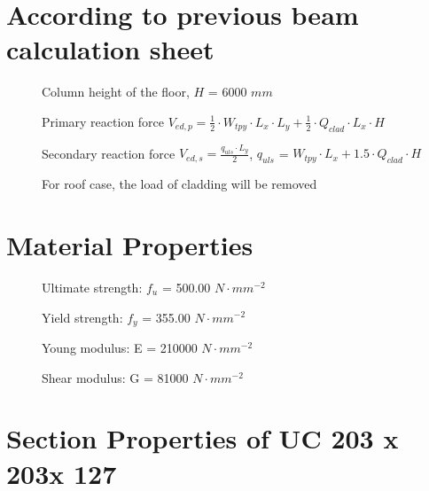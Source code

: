 \documentclass[
  letterpaper,
  DIV=11,
  numbers=noendperiod]{scrartcl}
\begin{document}
\section{According to previous beam calculation
sheet}\label{according-to-previous-beam-calculation-sheet}

\begin{description}
    \item[]Column height of the floor, $H$ = 6000 $mm$
    \item[]Primary reaction force $V_{ed,p} =\frac{1}{2}\cdot W_{tpy}\cdot L_{x}\cdot L_{y} + \frac{1}{2}\cdot Q_{clad}\cdot L_x \cdot H$
    \item[]Secondary reaction force $V_{ed,s} = \frac{q_{uls}\cdot L_y}{2}$, $q_{uls}$ = $W_{tpy}\cdot L_x + 1.5\cdot Q_{clad}\cdot H$
    \item[]For roof case, the load of cladding will be removed
\end{description}

\newpage{}

\section{}\label{section-7}

\section{Material Properties}\label{material-properties}

\begin{description}
  \item[]Ultimate strength: $f_{u}$ = 500.00 $N\cdot mm^{-2}$  
  \item[]Yield strength: $f_{y}$ = 355.00 $N \cdot mm^{-2}$  
  \item[]Young modulus: E = 210000 $N\cdot mm^{-2}$  
  \item[]Shear modulus: G = 81000 $N\cdot mm^{-2}$
\end{description}

\section{Section Properties of UC 203 x 203x
127}\label{section-properties-of-uc-203-x-203x-127}
\end{document}
